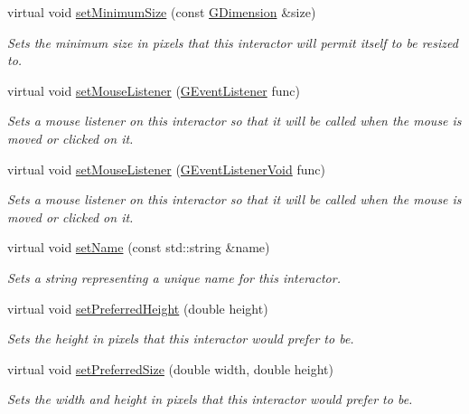 \begin{DoxyCompactItemize}
virtual void \mbox{\hyperlink{classsgl_1_1GInteractor_a3b1046117ac6cb7abe467e00ba8a81f4}{set\+Minimum\+Size}} (const \mbox{\hyperlink{structsgl_1_1GDimension}{G\+Dimension}} \&size)
\begin{DoxyCompactList}\small\item\em Sets the minimum size in pixels that this interactor will permit itself to be resized to. \end{DoxyCompactList}\item 
virtual void \mbox{\hyperlink{classsgl_1_1GInteractor_a37d8dbc943f59920f705b0104f60bde2}{set\+Mouse\+Listener}} (\mbox{\hyperlink{namespacesgl_ae9f3e9eab70035da1a2b114e21357b25}{G\+Event\+Listener}} func)
\begin{DoxyCompactList}\small\item\em Sets a mouse listener on this interactor so that it will be called when the mouse is moved or clicked on it. \end{DoxyCompactList}\item 
virtual void \mbox{\hyperlink{classsgl_1_1GInteractor_aea7f647ea62d59f71b5fad6aa65eeaf9}{set\+Mouse\+Listener}} (\mbox{\hyperlink{namespacesgl_a54427ce97bb1c2804e4fe2b0a62e8b17}{G\+Event\+Listener\+Void}} func)
\begin{DoxyCompactList}\small\item\em Sets a mouse listener on this interactor so that it will be called when the mouse is moved or clicked on it. \end{DoxyCompactList}\item 
virtual void \mbox{\hyperlink{classsgl_1_1GInteractor_a9d3a2685df23b5e7cbf59c19c4a1f9b5}{set\+Name}} (const std\+::string \&name)
\begin{DoxyCompactList}\small\item\em Sets a string representing a unique name for this interactor. \end{DoxyCompactList}\item 
virtual void \mbox{\hyperlink{classsgl_1_1GInteractor_a1ab987704fce32098706c6f00fb08218}{set\+Preferred\+Height}} (double height)
\begin{DoxyCompactList}\small\item\em Sets the height in pixels that this interactor would prefer to be. \end{DoxyCompactList}\item 
virtual void \mbox{\hyperlink{classsgl_1_1GInteractor_a042c5ae19430d765ef552371cae3632c}{set\+Preferred\+Size}} (double width, double height)
\begin{DoxyCompactList}\small\item\em Sets the width and height in pixels that this interactor would prefer to be. \end{DoxyCompactList}\item 

\end{DoxyCompactItemize}
